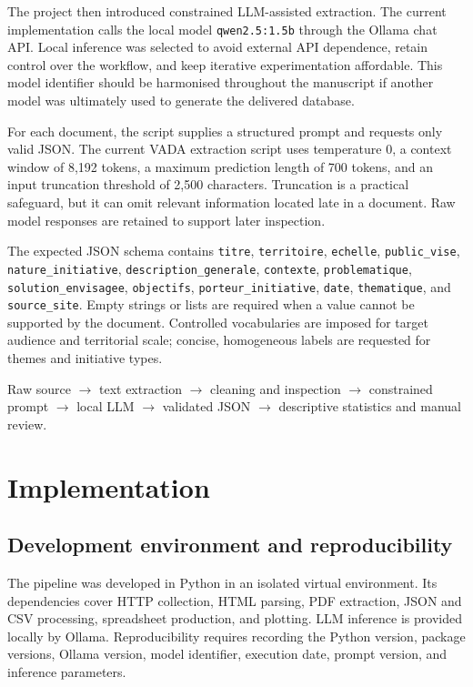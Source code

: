 The project then introduced constrained LLM-assisted extraction. The current
implementation calls the local model \texttt{qwen2.5:1.5b} through the Ollama
chat API. Local inference was selected to avoid external API dependence, retain
control over the workflow, and keep iterative experimentation affordable. This
model identifier should be harmonised throughout the manuscript if another model
was ultimately used to generate the delivered database.

For each document, the script supplies a structured prompt and requests only
valid JSON. The current VADA extraction script uses temperature 0, a context
window of 8,192 tokens, a maximum prediction length of 700 tokens, and an input
truncation threshold of 2,500 characters. Truncation is a practical safeguard,
but it can omit relevant information located late in a document. Raw model
responses are retained to support later inspection.

The expected JSON schema contains \texttt{titre}, \texttt{territoire},
\texttt{echelle}, \texttt{public\_vise}, \texttt{nature\_initiative},
\texttt{description\_generale}, \texttt{contexte}, \texttt{problematique},
\texttt{solution\_envisagee}, \texttt{objectifs},
\texttt{porteur\_initiative}, \texttt{date}, \texttt{thematique}, and
\texttt{source\_site}. Empty strings or lists are required when a value cannot
be supported by the document. Controlled vocabularies are imposed for target
audience and territorial scale; concise, homogeneous labels are requested for
themes and initiative types.

\begin{center}
Raw source $\rightarrow$ text extraction $\rightarrow$ cleaning and inspection
$\rightarrow$ constrained prompt $\rightarrow$ local LLM $\rightarrow$
validated JSON $\rightarrow$ descriptive statistics and manual review.
\end{center}

\chapter{Implementation}

\section{Development environment and reproducibility}

The pipeline was developed in Python in an isolated virtual environment. Its
dependencies cover HTTP collection, HTML parsing, PDF extraction, JSON and CSV
processing, spreadsheet production, and plotting. LLM inference is provided
locally by Ollama. Reproducibility requires recording the Python version,
package versions, Ollama version, model identifier, execution date, prompt
version, and inference parameters.


